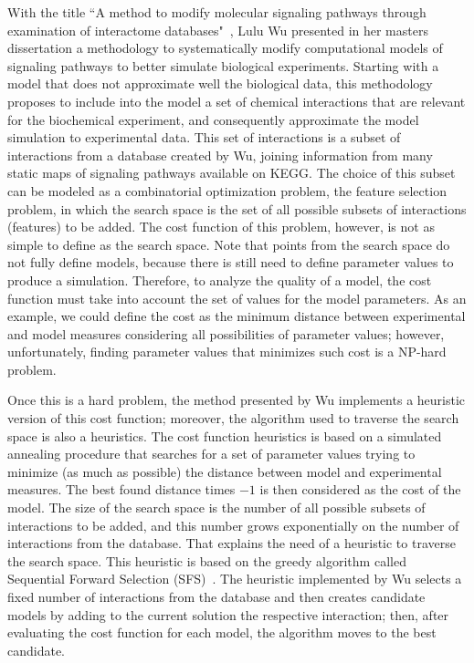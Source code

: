With the title ``A method to modify molecular signaling pathways through
examination of interactome databases"~\cite{Wu15}, Lulu Wu presented in 
her masters dissertation a methodology to systematically modify 
computational models of signaling pathways to better simulate biological 
experiments. Starting with a model that does not approximate well the 
biological data, this methodology proposes to include into the model
a set of chemical interactions that are relevant for the biochemical 
experiment, and consequently approximate the model simulation to 
experimental data. This set of interactions is a subset of interactions 
from a database created by Wu, joining information from many static 
maps of signaling pathways available on KEGG. The choice of this subset 
can be modeled as a combinatorial optimization problem, the feature 
selection problem, in which the search space is the set of all possible 
subsets of interactions (features) to be added. The cost function of 
this problem, however, is not as simple to define as the search space. 
Note that points from the search space do not fully define models, 
because there is still need to define parameter values to produce a 
simulation. Therefore, to analyze the quality of a model, the cost 
function must take into account the set of values for the model 
parameters. As an example, we could define the cost as the minimum 
distance between experimental and model measures considering all 
possibilities of parameter values; however, unfortunately, finding parameter values that minimizes such cost is a NP-hard problem.

Once this is a hard problem, the method presented by Wu 
implements a heuristic version of this cost function; moreover, the 
algorithm used to traverse the search space is also a heuristics. The 
cost function heuristics is based on a simulated annealing procedure 
that searches for a set of parameter values trying to minimize (as much 
as possible) the distance between model and experimental measures. The 
best found distance times $-1$ is then considered as the cost of the 
model. The size of the search space is the number of all 
possible subsets of interactions to be added, and this number grows
exponentially on the number of interactions from the database. That
explains the need of a heuristic to traverse the search space. This
heuristic is based on the greedy algorithm called Sequential Forward
Selection (SFS)~\cite{Whitney1971}. The heuristic implemented by Wu
selects a fixed number of interactions from the database and then
creates candidate models by adding to the current solution the
respective interaction; then, after evaluating the cost function for
each model, the algorithm moves to the best candidate.

